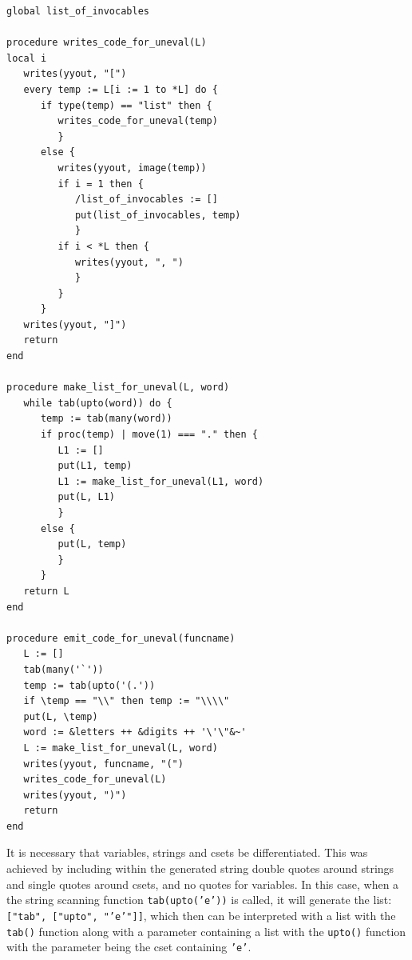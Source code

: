 \documentclass{article}
\begin{document}
\begin{verbatim}
global list_of_invocables

procedure writes_code_for_uneval(L)
local i
   writes(yyout, "[")
   every temp := L[i := 1 to *L] do {
      if type(temp) == "list" then {
         writes_code_for_uneval(temp)
         } 
      else {
         writes(yyout, image(temp))
         if i = 1 then {
            /list_of_invocables := []
            put(list_of_invocables, temp)
            }
         if i < *L then {
            writes(yyout, ", ")	
            }
         }
      }
   writes(yyout, "]")
   return
end

procedure make_list_for_uneval(L, word)
   while tab(upto(word)) do {
      temp := tab(many(word))
      if proc(temp) | move(1) === "." then {
         L1 := []
         put(L1, temp)
         L1 := make_list_for_uneval(L1, word)
         put(L, L1)
         }
      else {
         put(L, temp)
         }
      }
   return L
end

procedure emit_code_for_uneval(funcname)
   L := []
   tab(many('`'))
   temp := tab(upto('(.')) 
   if \temp == "\\" then temp := "\\\\"
   put(L, \temp)
   word := &letters ++ &digits ++ '\'\"&~'
   L := make_list_for_uneval(L, word)
   writes(yyout, funcname, "(")
   writes_code_for_uneval(L)
   writes(yyout, ")")
   return
end
\end{verbatim}
It is necessary that variables, strings and csets be differentiated.  This was achieved by including within the generated string double quotes around strings and single quotes around csets, and no quotes for variables.  In this case, when a the string scanning function \texttt{tab(upto('e'))} is called, it will generate the list: \texttt{["tab", ["upto", "'e'"]]}, which then can be interpreted with a list with the \texttt{tab()} function along with a parameter containing a list with the \texttt{upto()} function with the parameter being the cset containing \texttt{'e'}.
\end{document}

